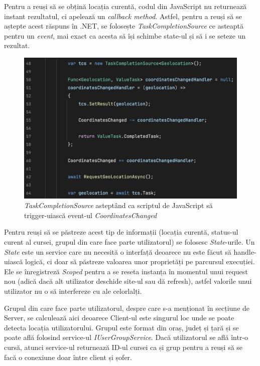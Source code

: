 Pentru a reuși să se obțină locația curentă, codul din JavaScript nu returnează instant rezultatul, ci
apelează un \textit{callback method}. Astfel, pentru a reuși să se aștepte acest răspuns în .NET, se folosește
\textit{TaskCompletionSource} ce asteaptă pentru un \textit{event}, mai exact ca acesta să își schimbe state-ul și
să i se seteze un rezultat.

\begin{figure}[H]
    \centering
    \includegraphics[width=14cm]{Assets/tcs.png}
    \caption{\textit{TaskCompletionSource} asteptând ca scriptul de JavaScript să trigger-uiască event-ul \textit{CoordinatesChanged}}
    \label{fig:tcs}
\end{figure}

Pentru reuși să se păstreze acest tip de informații (locația curentă, status-ul curent al cursei,
grupul din care face parte utilizatorul) se folosesc \textit{State}-urile. Un \textit{State} este un service
care nu necesită o interfață deoarece nu este făcut să handle-uiască logică, ci doar să
păstreze valoarea unor proprietăți pe parcursul execuției. Ele se înregistreză \textit{Scoped}
pentru a se reseta instanța în momentul unui request nou (adică dacă alt utilizator deschide site-ul sau dă refresh), astfel
valorile unui utilizator nu o să interfereze cu ale celorlalți.

Grupul din care face parte utilizatorul, despre care s-a menționat în secțiune de Server, se calculează
aici deoarece Client-ul este singurul loc unde se poate detecta locația utilizatorului.
Grupul este format din oraș, județ și țară și se poate află folosind service-ul \textit{IUserGroupService}.
Dacă utilizatorul se află într-o cursă, atunci service-ul returnează ID-ul cursei ca și grup pentru a reuși să
se facă o conexiune doar între client și șofer.

